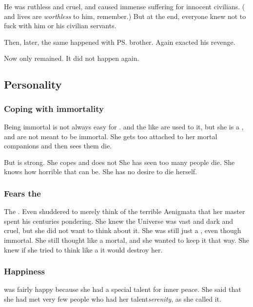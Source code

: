 He was ruthless and cruel, and caused immense suffering for innocent civilians. 
(\Resphan{} and \human{} lives are \emph{worthless} to him, remember.) 
But at the end, everyone knew not to fuck with him or his civilian servants. 

Then, later, the same happened with \ps{\Criseis} brother. 
Again \Ishnaruchaefir{} exacted his revenge. 

Now only \Criseis{} remained. 
It did not happen again. 









\subsection{Personality}





\subsubsection{Coping with immortality}
Being immortal is not always easy for \Criseis. 
\Dragons{} and the like are used to it, but she is a \scatha, and \scathae{} are not meant to be immortal. 
She gets too attached to her mortal companions and then sees them die. 

But \Criseis{} is strong. 
She copes and does not 
She has seen too many people die. 
She knows how horrible that can be. 
She has no desire to die herself. 





\subsubsection{Fears the \dragons}
The \dragons {}. 
Even \Criseis shuddered to merely think of the terrible Aenigmata that her master spent his centuries pondering.
She knew the Universe was vast and dark and cruel, but she did not want to think about it.
She was still just a \scatha, even though immortal.
She still thought like a mortal, and she wanted to keep it that way.
She knew if she tried to think like a \dragon it would destroy her.





\subsubsection{Happiness}
\Criseis was fairly happy because she had a special talent for inner peace. 
She said that she had met very few people who had her talent\her \emph{serenity}, as she called it.

